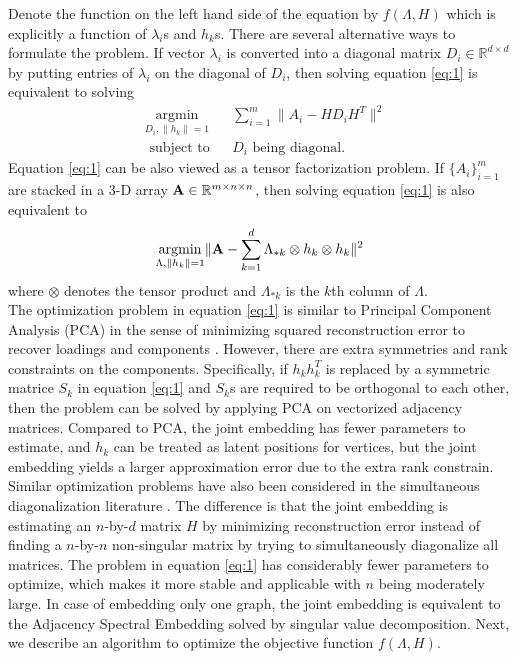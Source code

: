 \documentclass[10pt,journal,compsoc]{IEEEtran}
\begin{document}
 Denote the function on the left hand side of the equation by $f(\Lambda,H)$ which is explicitly a function of $\lambda_i$s and $h_k$s. There are several alternative ways to formulate the problem. If vector $\lambda_i$ is converted into a diagonal matrix $D_i \in \mathbb{R}^{d \times d}$ by putting entries of $\lambda_i$ on the diagonal of $D_i$, then solving equation \eqref{eq:1} is equivalent to solving
 \begin{equation*}
\begin{aligned}  
	& \underset{D_i,\|h_k\|=1}{\operatorname{argmin}} 
	& & \sum\limits_{i=1}^{m} \| A_i- H D_i H^T \|  ^2 \\
	& \text{ subject to} 
	& &  D_i \text{ being diagonal.}
\end{aligned}
\end{equation*}
Equation \eqref{eq:1} can be also viewed as a tensor factorization problem. If $\{A_i\}_{i=1}^m$ are stacked in a 3-D array ${\bf A} \in \mathbb{R}^{m\times n \times n}$, then solving equation \eqref{eq:1} is also equivalent to
\[  \underset{\Lambda,\|h_k\|=1}{\operatorname{argmin}}  \| {\bf A} - \sum\limits_{k=1}^{d} \Lambda_{*k} \otimes h_k \otimes h_k\|  ^2  \]
where $\otimes$ denotes the tensor product and $\Lambda_{*k}$ is the $k$th column of $\Lambda$. \\

\noindent The optimization problem in equation \eqref{eq:1} is similar to Principal Component Analysis (PCA) in the sense of minimizing squared reconstruction error to recover loadings and components \cite{jolliffe2002principal}. However, there are extra symmetries and rank constraints on the components. Specifically, if $h_k h_k^T$ is replaced by a symmetric matrice $S_k$ in equation \eqref{eq:1} and $S_k$s are required to be orthogonal to each other, then the problem can be solved by applying PCA on vectorized adjacency matrices. Compared to PCA, the joint embedding has fewer parameters to estimate, and $h_k$ can be treated as latent positions for vertices, but the joint embedding yields a larger approximation error due to the extra rank constrain. Similar optimization problems have also been considered in the simultaneous diagonalization literature \cite{flury1986algorithm} \cite{ziehe2004fast}. The difference is that the joint embedding is estimating an $n$-by-$d$ matrix $H$ by minimizing reconstruction error instead of finding a $n$-by-$n$ non-singular matrix by trying to simultaneously diagonalize all matrices. The problem in equation \eqref{eq:1} has considerably fewer parameters to optimize, which makes it more stable and applicable with $n$ being moderately large. In case of embedding only one graph, the joint embedding is equivalent to the Adjacency Spectral Embedding solved by singular value decomposition\cite{sussman2012consistent}. Next, we describe an algorithm to optimize the objective function $f(\Lambda,H)$.  
\end{document}
